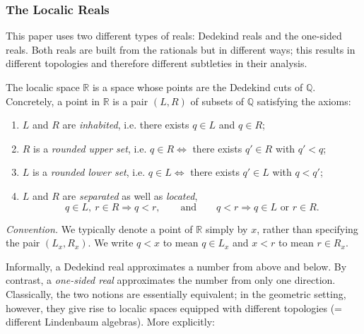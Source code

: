 \documentclass[a4paper, 11pt,reqno]{amsart}
\newcommand{\R}{\mathbb{R}}
\newcommand{\Q}{\mathbb{Q}}
\begin{document}
\subsubsection{The Localic Reals}\label{subsec:localicreals} This paper uses two different types of reals: Dedekind reals and the one-sided reals. Both reals are built from the rationals but in different ways; this results in different topologies and therefore different subtleties in their analysis.

\begin{definition}\label{def:DedR} The localic space $\R$ is a space whose points are the Dedekind cuts of $\Q$. Concretely, a point in $\R$ is a pair $(L,R)$ of subsets of $\Q$ satisfying the axioms:
	\begin{enumerate}
		\item $L$ and $R$ are {\em inhabited}, i.e. there exists $q\in L$ and $q\in R$;
		\item $R$ is a {\em rounded upper set}, i.e. $q\in R \iff $ there exists $q'\in R$ with $q'<q$;
		\item $L$ is a {\em rounded lower set}, i.e. $q\in L\iff$ there exists $q'\in L$ with $q<q'$;
		\item $L$ and $R$ are \emph{separated} as well as {\em located}, 
		\[ q\in L,\ r\in R \Longrightarrow q<r,
		\qquad\text{and}\qquad 
		q<r \Longrightarrow q\in L\text{ or }r\in R.
		\] 
 	\end{enumerate}
{\em Convention.} We typically denote a point of $\R$ simply by $x$, rather than specifying the pair $(L_x,R_x)$. We write $q<x$ to mean $q\in L_x$ and $x<r$ to mean $r\in R_x$.
\end{definition}

Informally, a Dedekind real approximates a number from above and below. By contrast, a {\em one-sided real} approximates the number from only one direction. Classically, the two notions are essentially equivalent; in the geometric setting, however, they give rise to localic spaces equipped with different topologies (= different Lindenbaum algebras). More explicitly:
\end{document}
